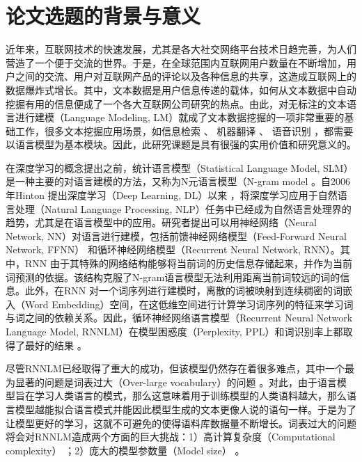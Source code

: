 \documentclass[12pt,a4paper]{article}
\begin{document}
\section{论文选题的背景与意义}
\label{sec:intro}
近年来，互联网技术的快速发展，尤其是各大社交网络平台技术日趋完善，为人们营造了一个便于交流的世界。于是，在全球范围内互联网用户数量在不断增加，用户之间的交流、用户对互联网产品的评论以及各种信息的共享，这造成互联网上的数据爆炸式增长。其中，文本数据是用户信息传递的载体，如何从文本数据中自动挖掘有用的信息便成了一个各大互联网公司研究的热点。由此，对无标注的文本语言进行建模（Language Modeling, LM）就成了文本数据挖掘的一项非常重要的基础工作，很多文本挖掘应用场景，如信息检索 \cite{Jin:2002:TLM:564376.564386}、 机器翻译 \cite{DBLP:conf/naacl/BaltescuB15}、 语音识别 \cite{DBLP:conf/interspeech/SakSB14}，都需要以语言模型为基本模块。因此，此研究课题是具有很强的实用价值和研究意义的。

在深度学习的概念提出之前，统计语言模型（Statistical Language Model, SLM） 是一种主要的对语言建模的方法，又称为N元语言模型（N-gram model \cite{DBLP:journals/csl/ChenG99}。自2006 年Hinton 提出深度学习（Deep Learning, DL）以来 \cite{hinton2006reducing}，将深度学习应用于自然语言处理（Natural Language Processing, NLP）任务中已经成为自然语言处理界的趋势，尤其是在语言模型中的应用。研究者提出可以用神经网络（Neural Network, NN）对语言进行建模，包括前馈神经网络模型（Feed-Forward Neural Network, FFNN）\cite{DBLP:conf/nips/BengioDV00} 和循环神经网络模型（Recurrent Neural Network, RNN）\cite{DBLP:conf/interspeech/MikolovKBCK10}。其中，RNN 由于其特殊的网络结构能够将当前词的历史信息存储起来，并作为当前词预测的依据。该结构克服了N-gram语言模型无法利用距离当前词较远的词的信息。此外，在RNN 对一个词序列进行建模时，离散的词被映射到连续稠密的词嵌入（Word Embedding）空间，在这低维空间进行计算学习词序列的特征来学习词与词之间的依赖关系。因此，循环神经网络语言模型（Recurrent Neural Network Language Model, RNNLM）在模型困惑度（Perplexity, PPL）和词识别率上都取得了最好的结果 \cite{DBLP:conf/icassp/MikolovKBCK11}。

尽管RNNLM已经取得了重大的成功，但该模型仍然存在着很多难点，其中一个最为显著的问题是词表过大（Over-large vocabulary）的问题 \cite{DBLP:conf/interspeech/ChenWLGW14}。对此，由于语言模型旨在学习人类语言的模式，那么这意味着用于训练模型的人类语料越大，那么语言模型越能拟合语言模式并能因此模型生成的文本更像人说的语句一样。于是为了让模型更好的学习，这就不可避免的使得语料库数据量不断增长。词表过大的问题将会对RNNLM造成两个方面的巨大挑战：1）高计算复杂度（Computational complexity） \cite{DBLP:conf/acl/ChenGA16}；2）庞大的模型参数量（Model size） \cite{DBLP:conf/nips/LiQYHL16}。
\end{document}
